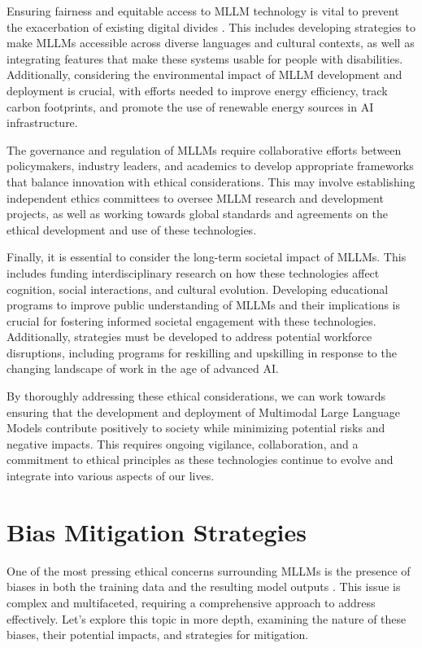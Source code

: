Ensuring fairness and equitable access to MLLM technology is vital to prevent the exacerbation of existing digital divides \cite{ray2023chatgpt}. This includes developing strategies to make MLLMs accessible across diverse languages and cultural contexts, as well as integrating features that make these systems usable for people with disabilities. Additionally, considering the environmental impact of MLLM development and deployment is crucial, with efforts needed to improve energy efficiency, track carbon footprints, and promote the use of renewable energy sources in AI infrastructure.

The governance and regulation of MLLMs require collaborative efforts between policymakers, industry leaders, and academics to develop appropriate frameworks that balance innovation with ethical considerations. This may involve establishing independent ethics committees to oversee MLLM research and development projects, as well as working towards global standards and agreements on the ethical development and use of these technologies\cite{rosenstrauch2023artificial}.

Finally, it is essential to consider the long-term societal impact of MLLMs. This includes funding interdisciplinary research on how these technologies affect cognition, social interactions, and cultural evolution. Developing educational programs to improve public understanding of MLLMs and their implications is crucial for fostering informed societal engagement with these technologies. Additionally, strategies must be developed to address potential workforce disruptions, including programs for reskilling and upskilling in response to the changing landscape of work in the age of advanced AI.

By thoroughly addressing these ethical considerations, we can work towards ensuring that the development and deployment of Multimodal Large Language Models contribute positively to society while minimizing potential risks and negative impacts. This requires ongoing vigilance, collaboration, and a commitment to ethical principles as these technologies continue to evolve and integrate into various aspects of our lives.

\section{Bias Mitigation Strategies}

One of the most pressing ethical concerns surrounding MLLMs is the presence of biases in both the training data and the resulting model outputs \cite{xu2024survey}. This issue is complex and multifaceted, requiring a comprehensive approach to address effectively. Let's explore this topic in more depth, examining the nature of these biases, their potential impacts, and strategies for mitigation.

